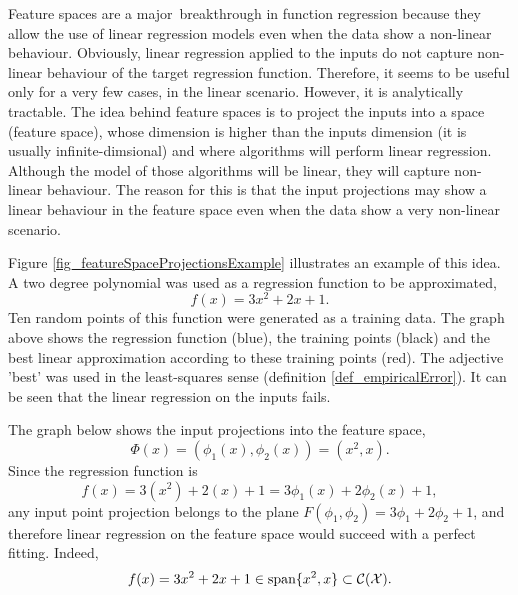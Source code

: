 Feature spaces are a major breakthrough in function regression because they allow the use of linear regression models even when the data show a non-linear behaviour. Obviously, linear regression applied to the inputs do not capture non-linear behaviour of the target regression function. Therefore, it seems to be useful only for a very few cases, in the linear scenario. However, it is analytically tractable. The idea behind feature spaces is to project the inputs into a space (feature space), whose dimension is higher than the inputs dimension (it is usually infinite\hyp{}dimsional) and where algorithms will perform linear regression. Although the model of those algorithms will be linear, they will capture non-linear behaviour. The reason for this is that the input projections may show a linear behaviour in the feature space even when the data show a very non-linear scenario.

\begin{example}
Figure \ref{fig_featureSpaceProjectionsExample} illustrates an example of this idea. A two degree polynomial was used as a regression function to be approximated,
\begin{equation*} 
  f(x) = 3x^2+2x+1.
\end{equation*}
Ten random points of this function were generated as a training data. The graph above shows the regression function (blue), the training points (black) and the best linear approximation according to these training points (red). The adjective 'best' was used in the least-squares sense (definition \ref{def_empiricalError}). It can be seen that the linear regression on the inputs fails. 

The graph below shows the input projections into the feature space,
\begin{equation*} 
  \Phi(x) = (\phi_1(x),\phi_2(x)) = (x^2,x).
\end{equation*}
Since the regression function is
\begin{equation*} 
  f(x) = 3(x^2)+2(x)+1 = 3\phi_1(x) + 2\phi_2(x) + 1, 
\end{equation*}
any input point projection belongs to the plane $F(\phi_1,\phi_2) = 3\phi_1 + 2\phi_2 + 1$, and therefore linear regression on the feature space would succeed with a perfect fitting. Indeed,
\begin{equation*}
  f(x) = 3x^2+2x+1 \in \textup{span}\{x^2,x\} \subset \mathcal{C}(\mathcal{X}).
\end{equation*}
\end{example}

